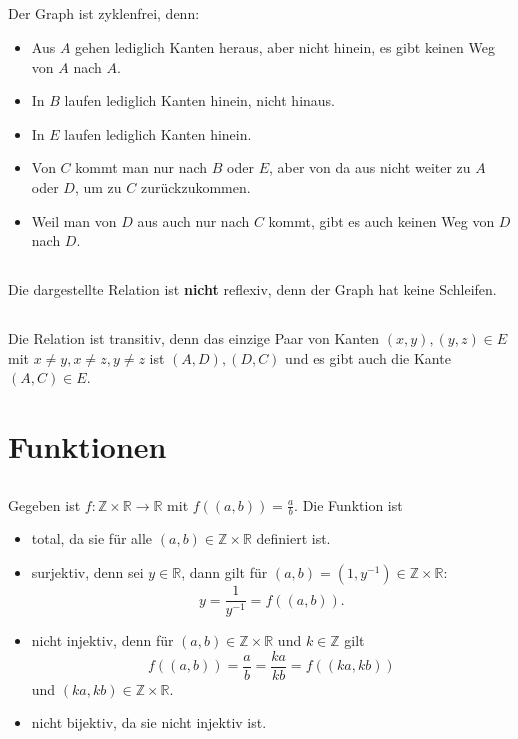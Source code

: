 \documentclass[a4paper]{article}
\begin{document}
\subsection{}
Der Graph ist zyklenfrei, denn:
\begin{itemize}
\item Aus $A$ gehen lediglich Kanten heraus, aber nicht hinein, es gibt keinen Weg von $A$ nach $A$.
\item In $B$ laufen lediglich Kanten hinein, nicht hinaus.
\item In $E$ laufen lediglich Kanten hinein.
\item Von $C$ kommt man nur nach $B$ oder $E$, aber von da aus nicht weiter zu $A$ oder $D$, um zu $C$ zurückzukommen.
\item Weil man von $D$ aus auch nur nach $C$ kommt, gibt es auch keinen Weg von $D$ nach $D$.
\end{itemize}

\subsection{}
Die dargestellte Relation ist \textbf{nicht} reflexiv, denn der Graph hat keine Schleifen.

\subsection{}
Die Relation ist transitiv, denn das einzige Paar von Kanten $(x,y), (y,z)\in E$ mit $x\ne y, x\ne z, y\ne z$ ist $(A,D), (D,C)$ und es gibt auch die Kante $(A,C)\in E$.

\setcounter{section}{2}
\section{Funktionen}

\subsection{}
Gegeben ist $f\colon ℤ\times ℝ\to ℝ$ mit $f((a,b)) = \frac{a}{b}$.
Die Funktion ist
\begin{itemize}
\item total, da sie für alle $(a,b)\in ℤ\times ℝ$ definiert ist.
\item surjektiv, denn sei $y\in ℝ$, dann gilt für $(a,b)=(1, y^{-1})\in ℤ\times ℝ$:
$$y = \frac{1}{y^{-1}} = f((a,b)).$$
\item nicht injektiv, denn für $(a,b)\in ℤ\times ℝ$ und $k\in ℤ$ gilt
$$f((a,b)) = \frac{a}{b} = \frac{ka}{kb} = f((ka,kb))$$
und $(ka, kb)\in ℤ\times ℝ$.
\item nicht bijektiv, da sie nicht injektiv ist.
\end{itemize}
\end{document}
